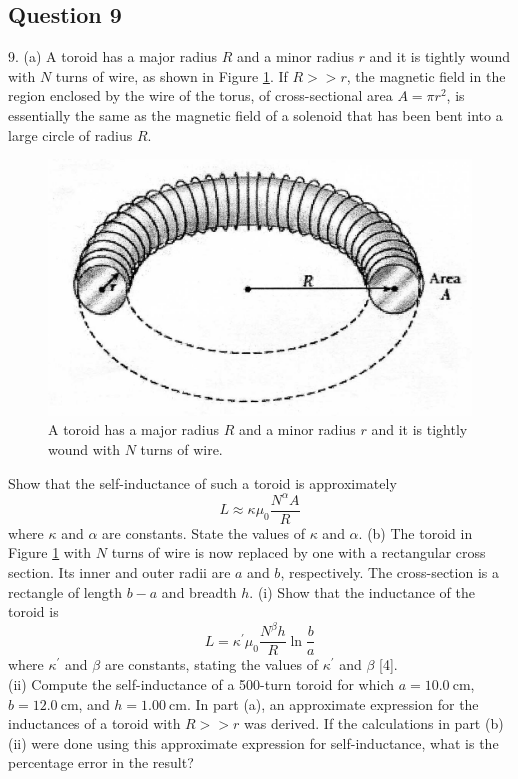 \documentclass{article}
\begin{document}
\subsection{Question 9}
9. (a) A toroid has a major radius $R$ and a minor radius $r$ and it is tightly wound with $N$ turns of wire, as shown in Figure \ref{2010q9}. If $R>>r$, the magnetic field in the region enclosed by the wire of the torus, of cross-sectional area $A=\pi r^{2}$, is essentially the same as the magnetic field of a solenoid that has been bent into a large circle of radius $R$.\\
\begin{figure}
	\includegraphics[width=0.8\linewidth]{spho_book_TYS_images/2010q9.png}
	\caption{A toroid has a major radius $R$ and a minor radius $r$ and it is tightly wound with $N$ turns of wire.} \label{2010q9}
\end{figure}
Show that the self-inductance of such a toroid is approximately
$$
L \approx \kappa \mu_{0} \frac{N^{\alpha} A}{R}
$$
where $\kappa$ and $\alpha$ are constants. State the values of $\kappa$ and $\alpha$.
(b) The toroid in Figure \ref{2010q9} with $N$ turns of wire is now replaced by one with a rectangular cross section. Its inner and outer radii are $a$ and $b$, respectively. The cross-section is a rectangle of length $b-a$ and breadth $h$.
(i) Show that the inductance of the toroid is
$$
L=\kappa^{\prime} \mu_{0} \frac{N^{\beta} h}{R} \ln \frac{b}{a}
$$
where $\kappa^{\prime}$ and $\beta$ are constants, stating the values of $\kappa^{\prime}$ and $\beta$ [4]. \\
(ii) Compute the self-inductance of a 500-turn toroid for which $a=10.0 \mathrm{~cm}$, $b=12.0 \mathrm{~cm}$, and $h=1.00 \mathrm{~cm}$. In part (a), an approximate expression for the inductances of a toroid with $R>>r$ was derived. If the calculations in part (b) (ii) were done using this approximate expression for self-inductance, what is the percentage error in the result? \\
\end{document}
